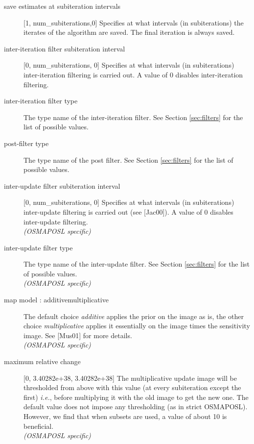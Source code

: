 \documentclass{article}
\begin{document}
\begin{description}
\item[save estimates at subiteration intervals] [1, num\_subiterations,0{]} 
Specifies at what intervals (in subiterations) the iterates of 
the algorithm are saved. The final iteration is always saved.



\item[inter-iteration filter subiteration interval] [0, num\_subiterations, 0{]}
Specifies at what intervals (in subiterations) inter-iteration 
filtering is carried out. A value of 0 disables inter-iteration 
filtering.


\item[inter-iteration filter type]
The type name of the inter-iteration filter. See Section \ref{sec:filters}
for the list of possible values.

\item[post-filter type]
The type name of the post filter. See Section \ref{sec:filters} for the list 
of possible values.


\item[inter-update filter subiteration interval] [0, num\_subiterations, 0{]}
Specifies at what intervals (in subiterations) inter-update filtering 
is carried out (see [Jac00]). A value of 0 disables inter-update filtering.\\
\textit{(OSMAPOSL specific)}

\item[inter-update filter type]
The type name of the inter-update filter. See Section \ref{sec:filters} for 
the list of possible values.\\
\textit{(OSMAPOSL specific)}


\item[map model : additive{\textbar}multiplicative]
The default choice \textit{additive} applies the prior on the image 
as is, the other choice \textit{multiplicative} applies it essentially 
on the image times the sensitivity image. See [Mus01] for more 
details.\\
\textit{(OSMAPOSL specific)}

\item[maximum relative change] [0, 3.40282e+38, 3.40282e+38{]}
The multiplicative update image will be thresholded from above 
with this value (at every subiteration except the first) \textit{i.e.}, 
before multiplying it with the old image to get the new one. 
The default value does not impose any thresholding (as in strict 
OSMAPOSL). However, we find that when subsets are used, a value 
of about 10 is beneficial.\\
\textit{(OSMAPOSL specific)}



\end{description}
\end{document}
